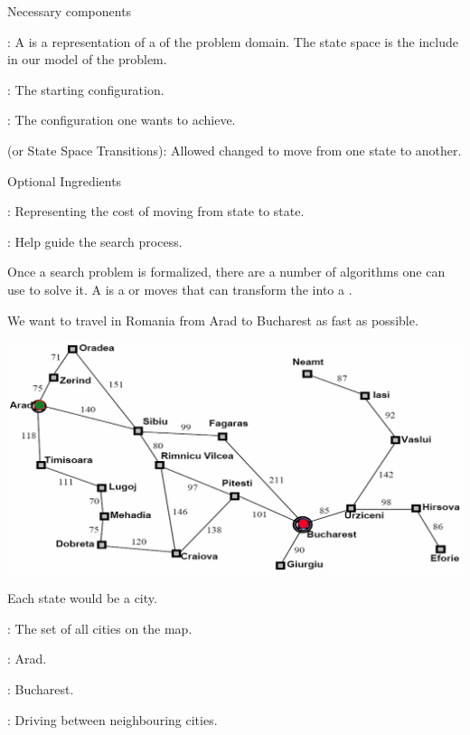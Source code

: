 \begin{listu}
    \item Necessary components
    
    \begin{listo}
        \item {}: A  is a representation of a  of the problem domain. The state space is the  include in our model of the problem. 
        \item {}: The starting configuration. 
        \item {}: The configuration one wants to achieve. 
        \item {} (or State Space Transitions): Allowed changed to move from one state to another. 
    \end{listo}

    \item Optional Ingredients 
    
    \begin{listu}
        \item {}: Representing the cost of moving from state to state. 
        \item {}: Help guide the search process. 
    \end{listu}
\end{listu}

Once a search problem is formalized, there are a number of algorithms one can use to solve it. A  is a  or moves that can transform the  into a . 

\begin{example}
    We want to travel in Romania from Arad to Bucharest as fast as possible. 

    \begin{center}
        \includegraphics[width=0.75\linewidth]{figures/Romania Travel.png}
    \end{center}

    Each state would be a city. 

    \begin{listu}
        \item {}: The set of all cities on the map.
        \item {}: Arad.
        \item {}: Bucharest.
        \item {}: Driving between neighbouring cities.
    \end{listu}
\end{example}

